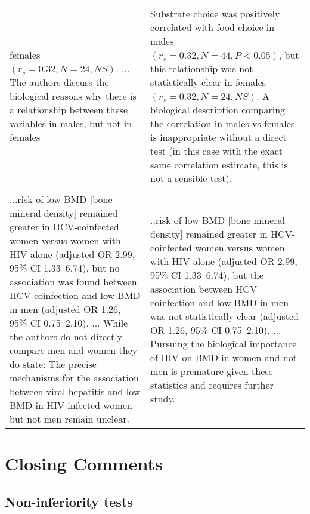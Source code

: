 \begin{tabular}{p{7.5cm}p{7.5cm}}
        females $(r_{s} = 0.32, N = 24, NS)$. ... The authors discuss the biological reasons why there is a relationship 
        between these variables in males, but not in females & 
        Substrate choice was positively correlated with food choice in males $(r_{s} = 0.32, N = 44, P < 0.05)$, but this
        relationship was not statistically clear in females $(r_{s} = 0.32, N = 24, NS)$. A biological description comparing 
        the correlation in males vs females is inappropriate without a direct test (in this case with the exact same 
        correlation estimate, this is not a sensible test).
\\
        \\
        ...risk of low BMD [bone mineral density] remained greater in HCV-coinfected women versus women with HIV alone
        (adjusted OR 2.99, 95\% CI 1.33–6.74), but no association was found between HCV coinfection and low BMD in men 
        (adjusted OR 1.26, 95\% CI 0.75–2.10). ... While the authors do not directly compare men and women they do state: 
        The precise mechanisms for the association between viral hepatitis and low BMD in HIV-infected women but not men 
        remain unclear.
& 
        ..risk of low BMD [bone mineral density] remained greater in HCV-coinfected women versus women with HIV alone
        (adjusted OR 2.99, 95\% CI 1.33–6.74), but the association between HCV coinfection and low BMD in men was not
        statistically clear (adjusted OR 1.26, 95\% CI 0.75–2.10). ... Pursuing the biological importance of HIV on BMD in 
        women and not men is premature given these statistics and requires further study.
        \\
\end{tabular}

\section*{Closing Comments}

\subsection*{Non-inferiority tests}

